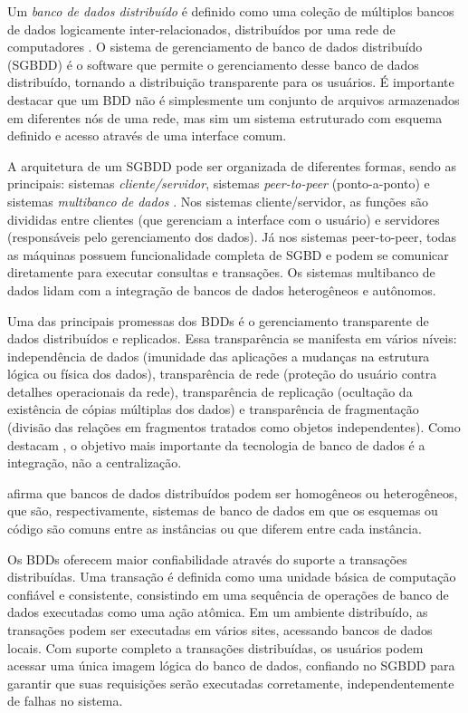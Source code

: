 Um \textit{banco de dados distribuído} é definido como uma coleção de múltiplos bancos de dados logicamente inter-relacionados, distribuídos por uma rede de computadores . O sistema de gerenciamento de banco de dados distribuído (SGBDD) é o software que permite o gerenciamento desse banco de dados distribuído, tornando a distribuição transparente para os usuários. É importante destacar que um BDD não é simplesmente um conjunto de arquivos armazenados em diferentes nós de uma rede, mas sim um sistema estruturado com esquema definido e acesso através de uma interface comum.

A arquitetura de um SGBDD pode ser organizada de diferentes formas, sendo as principais: sistemas \textit{cliente/servidor}, sistemas \textit{peer-to-peer} (ponto-a-ponto) e sistemas \textit{multibanco de dados} . Nos sistemas cliente/servidor, as funções são divididas entre clientes (que gerenciam a interface com o usuário) e servidores (responsáveis pelo gerenciamento dos dados). Já nos sistemas peer-to-peer, todas as máquinas possuem funcionalidade completa de SGBD e podem se comunicar diretamente para executar consultas e transações. Os sistemas multibanco de dados lidam com a integração de bancos de dados heterogêneos e autônomos.

Uma das principais promessas dos BDDs é o gerenciamento transparente de dados distribuídos e replicados. Essa transparência se manifesta em vários níveis: independência de dados (imunidade das aplicações a mudanças na estrutura lógica ou física dos dados), transparência de rede (proteção do usuário contra detalhes operacionais da rede), transparência de replicação (ocultação da existência de cópias múltiplas dos dados) e transparência de fragmentação (divisão das relações em fragmentos tratados como objetos independentes). Como destacam , o objetivo mais importante da tecnologia de banco de dados é a integração, não a centralização.

 afirma que bancos de dados distribuídos podem ser homogêneos ou heterogêneos, que são, respectivamente, sistemas de banco de dados em que os esquemas ou código são comuns entre as instâncias ou que diferem entre cada instância.

Os BDDs oferecem maior confiabilidade através do suporte a transações distribuídas. Uma transação é definida como uma unidade básica de computação confiável e consistente, consistindo em uma sequência de operações de banco de dados executadas como uma ação atômica. Em um ambiente distribuído, as transações podem ser executadas em vários sites, acessando bancos de dados locais. Com suporte completo a transações distribuídas, os usuários podem acessar uma única imagem lógica do banco de dados, confiando no SGBDD para garantir que suas requisições serão executadas corretamente, independentemente de falhas no sistema.

